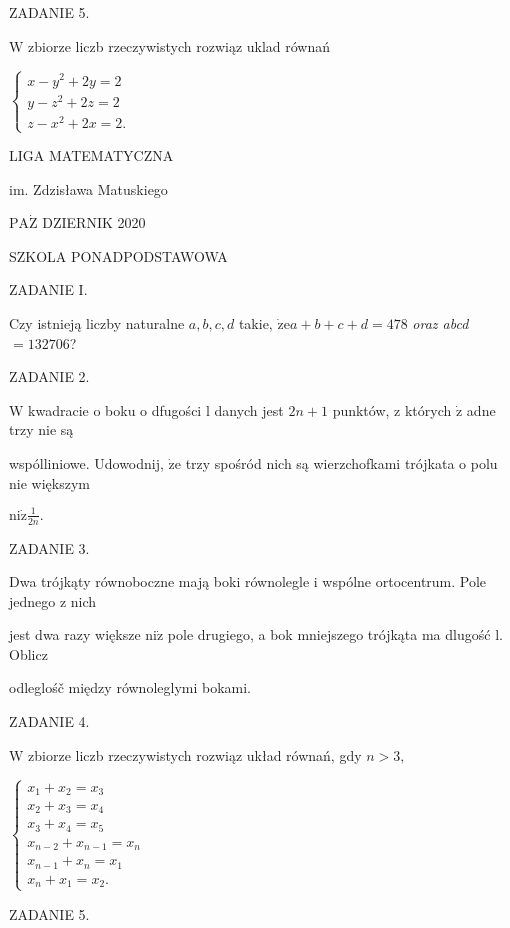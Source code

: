 \documentclass[a4paper,12pt]{article}
\begin{document}
ZADANIE 5.

$\mathrm{W}$ zbiorze liczb rzeczywistych rozwiąz uklad równań

$\left\{\begin{array}{l}
x-y^{2}+2y=2\\
y-z^{2}+2z=2\\
z-x^{2}+2x=2.
\end{array}\right.$






LIGA MATEMATYCZNA

im. Zdzisława Matuskiego

$\mathrm{P}\mathrm{A}\dot{\mathrm{Z}}$ DZIERNIK 2020

SZKOLA PONADPODSTAWOWA

ZADANIE I.

Czy istnieją liczby naturalne $a, b, c, d$ takie, $\dot{\mathrm{z}}\mathrm{e}a+b+c+d=478$ {\it oraz abcd}$=132706$?

ZADANIE 2.

$\mathrm{W}$ kwadracie o boku o dfugości l danych jest $2n+1$ punktów, z których $\dot{\mathrm{z}}$ adne trzy nie są

wspólliniowe. Udowodnij, $\dot{\mathrm{z}}\mathrm{e}$ trzy spośród nich są wierzchofkami trójkata o polu nie większym

$\displaystyle \mathrm{n}\mathrm{i}\dot{\mathrm{z}}\frac{1}{2n}.$

ZADANIE 3.

Dwa trójkąty równoboczne mają boki równolegle i wspólne ortocentrum. Pole jednego z nich

jest dwa razy większe $\mathrm{n}\mathrm{i}\dot{\mathrm{z}}$ pole drugiego, a bok mniejszego trójkąta ma dlugość l. Oblicz

odleglośč między równoleglymi bokami.

ZADANIE 4.

$\mathrm{W}$ zbiorze liczb rzeczywistych rozwiąz układ równań, gdy $n>3,$

$\left\{\begin{array}{l}
x_{1}+x_{2}=x_{3}\\
x_{2}+x_{3}=x_{4}\\
x_{3}+x_{4}=x_{5}\\
x_{n-2}+x_{n-1}=x_{n}\\
x_{n-1}+x_{n}=x_{1}\\
x_{n}+x_{1}=x_{2}.
\end{array}\right.$

ZADANIE 5.
\end{document}
